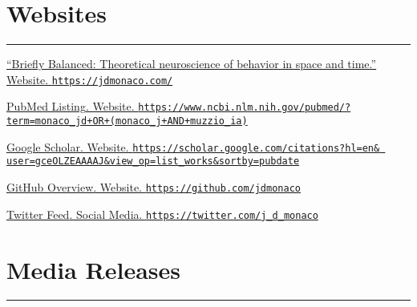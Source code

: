 \documentclass[10pt]{article}
\newcommand{\itemtitle}[1]{{\color{hopkinsblue}\ul{#1}}}
\newcommand{\itemnote}[1]{
  \begin{description}
    \item[$\rightarrow$] \hspace{.09in}{\color{darkgray}\it #1}
  \end{description}
}
\newcommand{\aurl}[1]{{\color{dimgray}\texttt{#1}}}
\newcommand{\newsection}[2]{%
  \section*{#1}
  \vspace{-.125in}
  \hrule
  \vspace{.22in}
  \label{sec:#2}
}
\begin{document}


\newsection{Websites}{web}

\begin{description}
  \item \href{https://jdmonaco.com/}
    {``\itemtitle{Briefly Balanced: Theoretical neuroscience of behavior in
    space and time}.'' Website. \aurl{https://jdmonaco.com/}}
  \item \href{https://www.ncbi.nlm.nih.gov/pubmed/?term=monaco_jd+OR+(monaco_j+AND+muzzio_ia)}
    {\itemtitle{PubMed Listing}. Website.
    \aurl{https://www.ncbi.nlm.nih.gov/pubmed/?term=monaco\_jd+OR+(monaco\_j+AND+muzzio\_ia)}}
  \item \href{https://jdmonaco.com/google-scholar}
    {\itemtitle{Google Scholar}. Website. \aurl{https://scholar.google.com/citations?hl=en\& user=gceOLZEAAAAJ\&view\_op=list\_works\&sortby=pubdate}}
  \item \href{https://github.com/jdmonaco}
    {\itemtitle{GitHub Overview}. Website. \aurl{https://github.com/jdmonaco}}
  \item \href{https://twitter.com/j_d_monaco}
    {\itemtitle{Twitter Feed}. Social Media. \aurl{https://twitter.com/j\_d\_monaco}}
\end{description}

\newsection{Media Releases}{pr}
\end{document}
